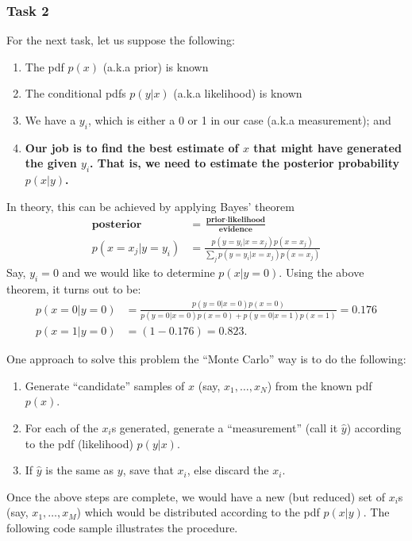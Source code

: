 \documentclass[11pt,onecolumn]{article}
\begin{document}
\subsubsection{Task 2}
For the next task, let us suppose the following:
\begin{enumerate}
  \item The pdf $p(x)$ (a.k.a prior) is known
 \item The conditional pdfs $p(y|x)$ (a.k.a likelihood) is known
 \item We have a $y_i$, which is either a 0 or 1 in our case (a.k.a measurement); and
 \item \bf Our job is to find the best estimate of $x$ that might have generated the given $y_i$. That is, we need to estimate the posterior probability $p(x|y)$.
\end{enumerate}

In theory, this can be achieved by applying Bayes' theorem
\begin{align}
 \textbf{posterior} &= \frac{\textbf{prior} \cdot \textbf{likelihood}}{\textbf{evidence}} \\
 p(x = x_j| y = y_i) &= \frac{p(y = y_i | x = x_j) p(x = x_j)}{\sum_{j} p(y = y_i | x = x_j) p(x = x_j) }
\end{align}
Say, $y_i = 0$ and we would like to determine $p(x|y=0)$. Using the above theorem, it turns out to be:
\begin{align}
 p(x = 0|y = 0) &= \frac{p(y = 0 | x = 0) p(x = 0)}{p(y = 0 | x = 0) p(x = 0) + p(y = 0 | x = 1) p(x = 1) } = 0.176  \nonumber \\
 p(x = 1|y = 0) &= (1 - 0.176) = 0.823.
\end{align}


One approach to solve this problem the ``Monte Carlo'' way is to do the following:
\begin{enumerate}
 \item Generate ``candidate'' samples of $x$ (say, $x_1,\dots,x_N$) from the known pdf $p(x)$.
 \item For each of the $x_i$s generated, generate a ``measurement'' (call it $\hat y$) according to the pdf (likelihood) $p(y|x)$.
 \item If $\hat y$ is the same as $y$, save that $x_i$, else discard the $x_i$.
\end{enumerate}
Once the above steps are complete, we would have a new (but reduced) set of $x_i$s (say, $x_1, \dots, x_M$) which would be distributed according to the pdf $p(x|y)$.
The following code sample illustrates the procedure.
\end{document}
